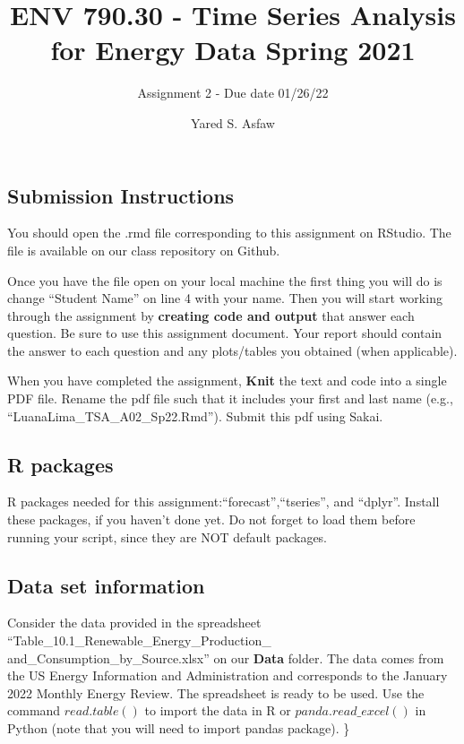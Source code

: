 \documentclass[
]{article}
\title{ENV 790.30 - Time Series Analysis for Energy Data \textbar{}
Spring 2021}
\subtitle{Assignment 2 - Due date 01/26/22}
\author{Yared S. Asfaw}
\date{}
\begin{document}
\maketitle

\hypertarget{submission-instructions}{%
\subsection{Submission Instructions}\label{submission-instructions}}

You should open the .rmd file corresponding to this assignment on
RStudio. The file is available on our class repository on Github.

Once you have the file open on your local machine the first thing you
will do is change ``Student Name'' on line 4 with your name. Then you
will start working through the assignment by \textbf{creating code and
output} that answer each question. Be sure to use this assignment
document. Your report should contain the answer to each question and any
plots/tables you obtained (when applicable).

When you have completed the assignment, \textbf{Knit} the text and code
into a single PDF file. Rename the pdf file such that it includes your
first and last name (e.g., ``LuanaLima\_TSA\_A02\_Sp22.Rmd''). Submit
this pdf using Sakai.

\hypertarget{r-packages}{%
\subsection{R packages}\label{r-packages}}

R packages needed for this assignment:``forecast'',``tseries'', and
``dplyr''. Install these packages, if you haven't done yet. Do not
forget to load them before running your script, since they are NOT
default packages.

\hypertarget{data-set-information}{%
\subsection{Data set information}\label{data-set-information}}

Consider the data provided in the spreadsheet
``Table\_10.1\_Renewable\_Energy\_Production\_
and\_Consumption\_by\_Source.xlsx'' on our \textbf{Data} folder. The
data comes from the US Energy Information and Administration and
corresponds to the January 2022 Monthly Energy Review. The spreadsheet
is ready to be used. Use the command \(read.table()\) to import the data
in R or \(panda.read\_excel()\) in Python (note that you will need to
import pandas package). \}
\end{document}
